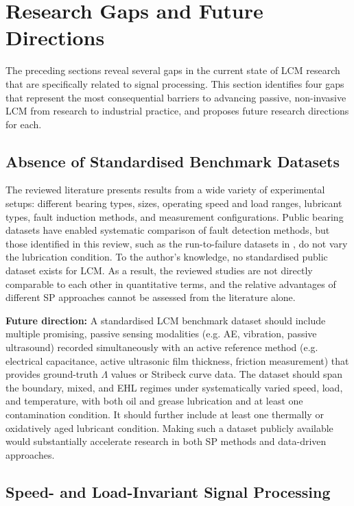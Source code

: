 \section{Research Gaps and Future Directions}
\label{sec:gaps}

The preceding sections reveal several gaps in the current state of LCM research that are specifically related to signal processing. This section identifies four gaps that represent the most consequential barriers to advancing passive, non-invasive LCM from research to industrial practice, and proposes future research directions for each.

\subsection{Absence of Standardised Benchmark Datasets}
\label{subsec:gap_datasets}

The reviewed literature presents results from a wide variety of experimental setups: different bearing types, sizes, operating speed and load ranges, lubricant types, fault induction methods, and measurement configurations. Public bearing datasets have enabled systematic comparison of fault detection methods, but those identified in this review, such as the run-to-failure datasets in \cite{jung_vibration_2024,arpa_university_2024}, do not vary the lubrication condition. To the author’s knowledge, no standardised public dataset exists for LCM. As a result, the reviewed studies are not directly comparable to each other in quantitative terms, and the relative advantages of different SP approaches cannot be assessed from the literature alone.

\textbf{Future direction:} A standardised LCM benchmark dataset should include multiple promising, passive sensing modalities (e.g. AE, vibration, passive ultrasound) recorded simultaneously with an active reference method (e.g. electrical capacitance, active ultrasonic film thickness, friction measurement) that provides ground-truth $\Lambda$ values or Stribeck curve data. The dataset should span the boundary, mixed, and EHL regimes under systematically varied speed, load, and temperature, with both oil and grease lubrication and at least one contamination condition. It should further include at least one thermally or oxidatively aged lubricant condition. Making such a dataset publicly available would substantially accelerate research in both SP methods and data-driven approaches.

\subsection{Speed- and Load-Invariant Signal Processing}
\label{subsec:gap_invariance}

